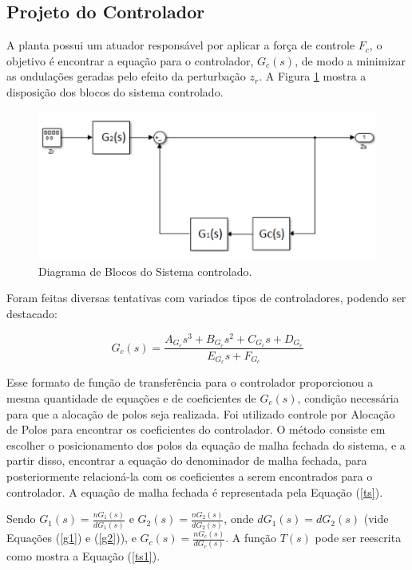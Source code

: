 \documentclass[journal,brazil,english]{IEEEtran}
\begin{document}
\subsection{Projeto do Controlador}\label{projetoControlador}
A planta possui um atuador responsável por aplicar a força de controle $F_c$, o objetivo é encontrar a equação para o controlador, $G_c(s)$, de modo a minimizar as ondulações geradas pelo efeito da perturbação $z_r$. A Figura \ref{blocos} mostra a disposição dos blocos do sistema controlado.

\begin{figure}[H]
	\centering
	\includegraphics[width=\columnwidth]{./imagens/diagrama_malha_fechada.pdf}
    \renewcommand{\figurename}{Fig.}
    \caption{Diagrama de Blocos do Sistema controlado.}
	\label{blocos}
\end{figure}

Foram feitas diversas tentativas com variados tipos de controladores, podendo ser destacado:

\begin{equation}
G_c(s)=\frac{A_{G_c}s^3+B_{G_c}s^2+C_{G_c}s+D_{G_c}}{E_{G_c}s+F_{G_c}}
\end{equation}

Esse formato de função de transferência para o controlador  proporcionou a mesma quantidade de equações e de coeficientes de $G_c(s)$, condição necessária para que a alocação de polos seja realizada. Foi utilizado controle por Alocação de Polos para encontrar os coeficientes do controlador. O método consiste em escolher o posicionamento dos polos da equação de malha fechada do sistema, e a partir disso, encontrar a equação do denominador de malha fechada, para posteriormente relacioná-la com os coeficientes a serem encontrados para o controlador. A equação de malha fechada é representada pela Equação (\ref{ts}).

Sendo $G_1(s)=\frac{nG_1(s)}{dG_1(s)}$ e $G_2(s)=\frac{nG_2(s)}{dG_2(s)}$, onde $dG_1(s)=dG_2(s)$ (vide Equações (\ref{g1}) e (\ref{g2})), e $G_c(s)=\frac{nG_c(s)}{dG_c(s)}$. A função $T(s)$ pode ser reescrita como mostra a Equação (\ref{ts1}).
\end{document}
